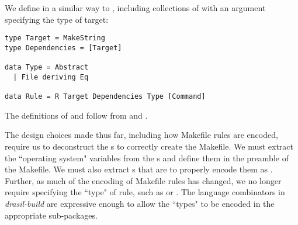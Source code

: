 {{{{{We define  in a similar way to , including collections of  with an argument specifying the type of target:

\begin{tcolorbox}
\begin{verbatim}
type Target = MakeString
type Dependencies = [Target]

data Type = Abstract
  | File deriving Eq

data Rule = R Target Dependencies Type [Command]
\end{verbatim}
\end{tcolorbox}

The definitions of  and  follow from  and .

The design choices made thus far, including how Makefile rules are encoded, require us to deconstruct the s to correctly create the Makefile. We must extract the ``operating system" variables from the s and define them in the preamble of the Makefile. We must also extract s that are  to properly encode them as . Further, as much of the encoding of Makefile rules has changed, we no longer require specifying the ``type" of rule, such as  or . The language combinators in \textit{drasil-build} are expressive enough to allow the ``types" to be encoded in the appropriate sub-packages.

%
%
%
%
%

}}}}}
